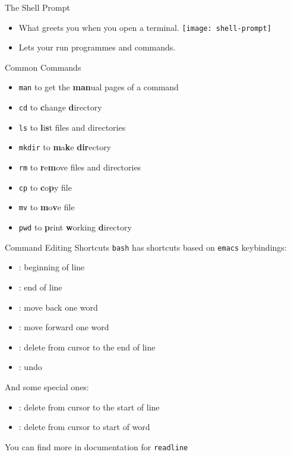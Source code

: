 \documentclass[12pt]{beamer}
\begin{document}
\begin{frame}{The Shell Prompt}
  \begin{itemize}
    \item What greets you when you open a terminal.
          \texttt{[image: shell-prompt]}
    \item Lets your run programmes and commands.
  \end{itemize}
\end{frame}

\begin{frame}{Common Commands}
  \begin{itemize}
    \item \texttt{man} to get the \textbf{man}ual pages of a command
    \item \texttt{cd} to \textbf{c}hange \textbf{d}irectory
    \item \texttt{ls} to \textbf{l}i\textbf{s}t files and directories
    \item \texttt{mkdir} to \textbf{m}a\textbf{k}e \textbf{dir}ectory
    \item \texttt{rm} to \textbf{r}e\textbf{m}ove files and directories
    \item \texttt{cp} to \textbf{c}o\textbf{p}y file
    \item \texttt{mv} to \textbf{m}o\textbf{v}e file
    \item \texttt{pwd} to \textbf{p}rint \textbf{w}orking \textbf{d}irectory
  \end{itemize}
\end{frame}

\begin{frame}{Command Editing Shortcuts}
  \texttt{bash} has shortcuts based on \texttt{emacs} keybindings:
  \begin{itemize}
    \item {}: beginning of line
    \item {}: end of line
    \item {}: move back one word
    \item {}: move forward one word
    \item {}: delete from cursor to the end of line
    \item \keys{\ctrlwin + \_}: undo
  \end{itemize}
  And some special ones:
  \begin{itemize}
    \item {}: delete from cursor to the start of line
    \item {}: delete from cursor to start of word
  \end{itemize}

  You can find more in documentation for \texttt{readline}
\end{frame}
\end{document}
